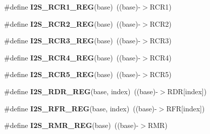 \begin{DoxyCompactItemize}
\item 
\#define {\bfseries I2\+S\+\_\+\+R\+C\+R1\+\_\+\+R\+EG}(base)~((base)-\/$>$R\+C\+R1)\hypertarget{group__I2S__Register__Accessor__Macros_ga0e72a70cec83128fe927cc42e499767e}{}\label{group__I2S__Register__Accessor__Macros_ga0e72a70cec83128fe927cc42e499767e}

\item 
\#define {\bfseries I2\+S\+\_\+\+R\+C\+R2\+\_\+\+R\+EG}(base)~((base)-\/$>$R\+C\+R2)\hypertarget{group__I2S__Register__Accessor__Macros_ga06fb6f3ab6761f72068561455d6f707c}{}\label{group__I2S__Register__Accessor__Macros_ga06fb6f3ab6761f72068561455d6f707c}

\item 
\#define {\bfseries I2\+S\+\_\+\+R\+C\+R3\+\_\+\+R\+EG}(base)~((base)-\/$>$R\+C\+R3)\hypertarget{group__I2S__Register__Accessor__Macros_gae7aecac6ac09bbe0118385b34ad8ff65}{}\label{group__I2S__Register__Accessor__Macros_gae7aecac6ac09bbe0118385b34ad8ff65}

\item 
\#define {\bfseries I2\+S\+\_\+\+R\+C\+R4\+\_\+\+R\+EG}(base)~((base)-\/$>$R\+C\+R4)\hypertarget{group__I2S__Register__Accessor__Macros_gae7d96a14af22052e8f9bb55da75351ec}{}\label{group__I2S__Register__Accessor__Macros_gae7d96a14af22052e8f9bb55da75351ec}

\item 
\#define {\bfseries I2\+S\+\_\+\+R\+C\+R5\+\_\+\+R\+EG}(base)~((base)-\/$>$R\+C\+R5)\hypertarget{group__I2S__Register__Accessor__Macros_ga5f806a100d1c29d4494f9ddc9ca598fc}{}\label{group__I2S__Register__Accessor__Macros_ga5f806a100d1c29d4494f9ddc9ca598fc}

\item 
\#define {\bfseries I2\+S\+\_\+\+R\+D\+R\+\_\+\+R\+EG}(base,  index)~((base)-\/$>$R\+DR\mbox{[}index\mbox{]})\hypertarget{group__I2S__Register__Accessor__Macros_gaf87694e4e332acdf778da3c5cda01da0}{}\label{group__I2S__Register__Accessor__Macros_gaf87694e4e332acdf778da3c5cda01da0}

\item 
\#define {\bfseries I2\+S\+\_\+\+R\+F\+R\+\_\+\+R\+EG}(base,  index)~((base)-\/$>$R\+FR\mbox{[}index\mbox{]})\hypertarget{group__I2S__Register__Accessor__Macros_ga75445d172ef4f6a4fb04f467d2817dbc}{}\label{group__I2S__Register__Accessor__Macros_ga75445d172ef4f6a4fb04f467d2817dbc}

\item 
\#define {\bfseries I2\+S\+\_\+\+R\+M\+R\+\_\+\+R\+EG}(base)~((base)-\/$>$R\+MR)\hypertarget{group__I2S__Register__Accessor__Macros_ga6e60f1c9b4eb83fba6b10ef9f541c429}{}\label{group__I2S__Register__Accessor__Macros_ga6e60f1c9b4eb83fba6b10ef9f541c429}


\end{DoxyCompactItemize}
